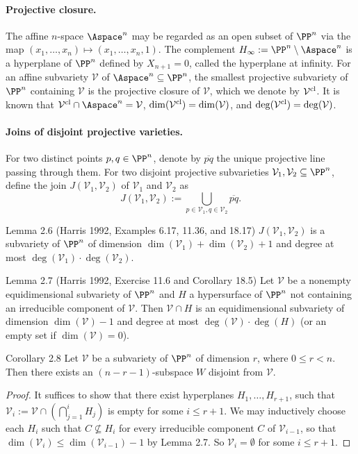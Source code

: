 \paragraph{Projective closure.}
The affine $n$-space $\Aspace^n$ may be regarded as an open subset of $\PP^n$ via the map $(x_1,\ldots,x_n)\mapsto(x_1,\ldots,x_n,1)$. The complement $H_\infty:=\PP^n\setminus\Aspace^n$ is a hyperplane of $\PP^n$ defined by $X_{n+1}=0$, called the hyperplane at infinity. For an affine subvariety $\mathcal V$ of $\Aspace^n\subseteq\PP^n$, the smallest projective subvariety of $\PP^n$ containing $\mathcal V$ is the projective closure of $\mathcal V$, which we denote by $\mathcal V^{\rm cl}$. It is known that $\mathcal V^{\rm cl}\cap\Aspace^n=\mathcal V$, $\dim(\mathcal V^{\rm cl})=\dim(\mathcal V)$, and $\deg(\mathcal V^{\rm cl})=\deg(\mathcal V)$.
\paragraph{Joins of disjoint projective varieties.}
For two distinct points $p,q\in\PP^n$, denote by $\overline{pq}$ the unique projective line passing through them. For two disjoint projective subvarieties $\mathcal V_1,\mathcal V_2\subseteq\PP^n$, define the join $J(\mathcal V_1,\mathcal V_2)$ of $\mathcal V_1$ and $\mathcal V_2$ as
\[J(\mathcal V_1,\mathcal V_2):=\bigcup_{p\in\mathcal V_1,q\in\mathcal V_2}\overline{pq}.\]
\begin{result}{Lemma 2.6 (Harris 1992, Examples 6.17, 11.36, and 18.17)}
$J(\mathcal V_1,\mathcal V_2)$ is a subvariety of $\PP^n$ of dimension $\dim(\mathcal V_1)+\dim(\mathcal V_2)+1$ and degree at most $\deg(\mathcal V_1)\cdot\deg(\mathcal V_2)$.
\end{result}
\begin{result}{Lemma 2.7 (Harris 1992, Exercise 11.6 and Corollary 18.5)}
Let $\mathcal V$ be a nonempty equidimensional subvariety of $\PP^n$ and $H$ a hypersurface of $\PP^n$ not containing an irreducible component of $\mathcal V$. Then $\mathcal V\cap H$ is an equidimensional subvariety of dimension $\dim(\mathcal V)-1$ and degree at most $\deg(\mathcal V)\cdot\deg(H)$ (or an empty set if $\dim(\mathcal V)=0$).
\end{result}
\begin{result}{Corollary 2.8}
Let $\mathcal V$ be a subvariety of $\PP^n$ of dimension $r$, where $0\le r<n$. Then there exists an $(n-r-1)$-subspace $W$ disjoint from $\mathcal V$.
\end{result}
\begin{proof}
It suffices to show that there exist hyperplanes $H_1,\ldots,H_{r+1}$, such that $\mathcal V_i:=\mathcal V\cap(\bigcap_{j=1}^iH_j)$ is empty for some $i\le r+1$. We may inductively choose each $H_i$ such that $C\not\subseteq H_i$ for every irreducible component $C$ of $\mathcal V_{i-1}$, so that $\dim(\mathcal V_i)\le\dim(\mathcal V_{i-1})-1$ by Lemma 2.7. So $\mathcal V_i=\emptyset$ for some $i\le r+1$.
\end{proof}
